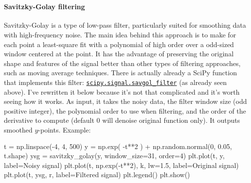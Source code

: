 \documentclass[11pt]{article}
\newenvironment{Shaded}{}{}
\newcommand{\DecValTok}[1]{\textcolor[rgb]{0.25,0.63,0.44}{{#1}}}
\newcommand{\FloatTok}[1]{\textcolor[rgb]{0.25,0.63,0.44}{{#1}}}
\newcommand{\StringTok}[1]{\textcolor[rgb]{0.25,0.44,0.63}{{#1}}}
\newcommand{\NormalTok}[1]{{#1}}
\newcommand{\OperatorTok}[1]{\textcolor[rgb]{0.40,0.40,0.40}{{#1}}}
\begin{document}
    \begin{center}
    \end{center}
    { \hspace*{\fill} \\} 
    \hypertarget{savitzky-golay-filtering}{%
\paragraph{Savitzky-Golay filtering}\label{savitzky-golay-filtering}}

Savitzky-Golay is a type of low-pass filter, particularly suited for
smoothing data with high-frequency noise. The main idea behind this
approach is to make for each point a least-square fit with a polynomial
of high order over a odd-sized window centered at the point. It has the
advantage of preserving the original shape and features of the signal
better than other types of filtering approaches, such as moving average
techniques.
There is actually already a SciPy function that implements this filter: \href{https://docs.scipy.org/doc/scipy/reference/generated/scipy.signal.savgol_filter.html}{\texttt{scipy.signal.savgol\_filter}} (as already seen above). I've rewritten it below because it's not that complicated and it's worth seeing how it works. As input, it takes the noisy data, the filter window size (odd positive integer), the polynomial order to use when filtering, and the order of the derivative to compute (default \(0\) will denoise original function only). It outputs smoothed \(y\)-points. Example:
\begin{Shaded}
\begin{Highlighting}[]
\NormalTok{t }\OperatorTok{=}\NormalTok{ np.linspace(}\OperatorTok{{-}}\DecValTok{4}\NormalTok{, }\DecValTok{4}\NormalTok{, }\DecValTok{500}\NormalTok{)}
\NormalTok{y }\OperatorTok{=}\NormalTok{ np.exp( }\OperatorTok{{-}}\NormalTok{t}\OperatorTok{**}\DecValTok{2}\NormalTok{ ) }\OperatorTok{+}\NormalTok{ np.random.normal(}\DecValTok{0}\NormalTok{, }\FloatTok{0.05}\NormalTok{, t.shape)}
\NormalTok{ysg }\OperatorTok{=}\NormalTok{ savitzky\_golay(y, window\_size}\OperatorTok{=}\DecValTok{31}\NormalTok{, order}\OperatorTok{=}\DecValTok{4}\NormalTok{)}
\NormalTok{plt.plot(t, y, label}\OperatorTok{=}\StringTok{\textquotesingle{}Noisy signal\textquotesingle{}}\NormalTok{)}
\NormalTok{plt.plot(t, np.exp(}\OperatorTok{{-}}\NormalTok{t}\OperatorTok{**}\DecValTok{2}\NormalTok{), }\StringTok{\textquotesingle{}k\textquotesingle{}}\NormalTok{, lw}\OperatorTok{=}\FloatTok{1.5}\NormalTok{, label}\OperatorTok{=}\StringTok{\textquotesingle{}Original signal\textquotesingle{}}\NormalTok{)}
\NormalTok{plt.plot(t, ysg, }\StringTok{\textquotesingle{}r\textquotesingle{}}\NormalTok{, label}\OperatorTok{=}\StringTok{\textquotesingle{}Filtered signal\textquotesingle{}}\NormalTok{)}
\NormalTok{plt.legend()}
\NormalTok{plt.show()}
\end{Highlighting}
\end{Shaded}
\end{document}
